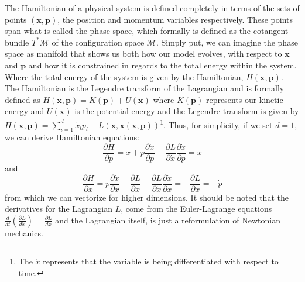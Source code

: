 \documentclass[twoside]{article}
\begin{document}
The Hamiltonian of a physical system is defined completely in terms of the sets of points $(\textbf{x}, \textbf{p})$, the position and momentum variables respectively. These points span what is called the phase space, which formally is defined as the cotangent bundle $T^{*}\mathcal{M}$ of the configuration space $\mathcal{M}$. Simply put, we can imagine the phase space as manifold that shows us both how our model evolves, with respect to $\textbf{x}$ and $\textbf{p}$ and how it is constrained in regards to the total energy within the system. Where the total energy of the system is given by the Hamiltonian, $H(\textbf{x},\textbf{p})$. The Hamiltonian is the Legendre transform of the Lagrangian and is formally defined as $
H(\textbf{x}, \textbf{p})  = K(\textbf{p}) + U(\textbf{x})$ where $K(\textbf{p})$ represents our kinetic energy and $U(\textbf{x})$ is the potential energy and the Legendre transform is given by $H(\textbf{x},\textbf{p}) = \sum_{i = 1}^{d}\dot{x}_{l}p_{l} - L(\textbf{x}, \textbf{\.{x}}(\textbf{x}, \textbf{p})) $\footnote{The $\dot{x}$ represents that the variable is being differentiated with respect to time.}.  
Thus, for simplicity, if we set $d = 1$, we can derive Hamiltonian equations: \begin{equation}
\frac{\partial H}{\partial p} = \dot{x} + p\frac{\partial \dot{x}}{\partial p} - \frac{\partial L}{\partial \dot{x}}\frac{\partial \dot{x}}{\partial p} = \dot{x} \end{equation}
and 
\begin{equation}
\label{eq:hameq2}
\frac{\partial H}{\partial x} = p\frac{\partial \dot{x}}{\partial x} - \frac{\partial L}{\partial x} - \frac{\partial L}{\partial \dot{x}}\frac{\partial \dot{x}}{\partial x} = - \frac{\partial L}{\partial x}= -\dot{p}  \end{equation}
from which we can vectorize for higher dimensions. It should be noted that the derivatives for the Lagrangian $L$, come from the Euler-Lagrange equations $\frac{d}{dt}\left(\frac{\partial L}{d\dot{x}}\right) = \frac{\partial L}{dx}$ and the Lagrangian itself, is just a reformulation of Newtonian mechanics.
\end{document}
